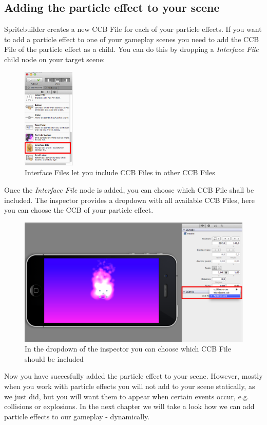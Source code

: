 \documentclass{scrreprt}
\begin{document}
\subsection{Adding the particle effect to your scene}
Spritebuilder creates a new CCB File for each of your particle effects. If you
want to add a particle effect to one of your gameplay scenes you need to add the
CCB File of the particle effect as a child. 
You can do this by dropping a \textit{Interface File} child node on your target
scene:
\begin{figure}[H]
		\centering
		\includegraphics[width=70pt]{images/particles/Spritebuilder_ParticleEffect_AddInterfaceFile.png}   
		\caption{Interface Files let you include CCB Files in other CCB Files}
\end{figure}
Once the \textit{Interface File} node is added, you can choose which CCB File
shall be included. The inspector provides a dropdown with all available CCB
Files, here you can choose the CCB of your particle effect.
 \begin{figure}[H]
		\centering
		\includegraphics[width=375pt]{images/particles/Spritebuilder_ParticleEffect_InterfaceFile.png}
		\caption{In the dropdown of the inspector you can choose which CCB File
		should be included}
\end{figure}
Now you have succesfully added the particle effect to your scene. However,
mostly when you work with particle effects you will not add to your scene
statically, as we just did, but you will want them to appear when certain events
occur, e.g. collisions or explosions. In the next chapter we will take a look
how we can add particle effects to our gameplay - dynamically. 
\end{document}
